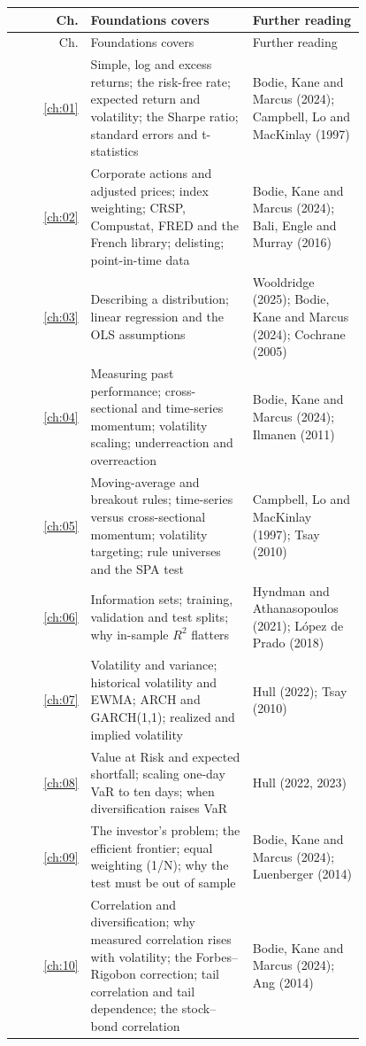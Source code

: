 \begingroup
\small
\setlength{\LTpre}{6pt}\setlength{\LTpost}{6pt}
\begin{longtable}{@{}r>{\raggedright\arraybackslash}p{0.468\linewidth}>{\raggedright\arraybackslash}p{0.324\linewidth}@{}}
\toprule
Ch. & Foundations covers & Further reading \\
\midrule
\endfirsthead
\toprule
Ch. & Foundations covers & Further reading \\
\midrule
\endhead
\bottomrule
\endlastfoot
\ref{ch:01} & Simple, log and excess returns; the risk-free rate; expected return and volatility; the Sharpe ratio; standard errors and t-statistics & Bodie, Kane and Marcus (2024); Campbell, Lo and MacKinlay (1997) \\
\ref{ch:02} & Corporate actions and adjusted prices; index weighting; CRSP, Compustat, FRED and the French library; delisting; point-in-time data & Bodie, Kane and Marcus (2024); Bali, Engle and Murray (2016) \\
\ref{ch:03} & Describing a distribution; linear regression and the OLS assumptions & Wooldridge (2025); Bodie, Kane and Marcus (2024); Cochrane (2005) \\
\ref{ch:04} & Measuring past performance; cross-sectional and time-series momentum; volatility scaling; underreaction and overreaction & Bodie, Kane and Marcus (2024); Ilmanen (2011) \\
\ref{ch:05} & Moving-average and breakout rules; time-series versus cross-sectional momentum; volatility targeting; rule universes and the SPA test & Campbell, Lo and MacKinlay (1997); Tsay (2010) \\
\ref{ch:06} & Information sets; training, validation and test splits; why in-sample $R^2$ flatters & Hyndman and Athanasopoulos (2021); L\'opez de Prado (2018) \\
\ref{ch:07} & Volatility and variance; historical volatility and EWMA; ARCH and GARCH(1,1); realized and implied volatility & Hull (2022); Tsay (2010) \\
\ref{ch:08} & Value at Risk and expected shortfall; scaling one-day VaR to ten days; when diversification raises VaR & Hull (2022, 2023) \\
\ref{ch:09} & The investor's problem; the efficient frontier; equal weighting (1/N); why the test must be out of sample & Bodie, Kane and Marcus (2024); Luenberger (2014) \\
\ref{ch:10} & Correlation and diversification; why measured correlation rises with volatility; the Forbes--Rigobon correction; tail correlation and tail dependence; the stock--bond correlation & Bodie, Kane and Marcus (2024); Ang (2014) \\

\end{longtable}
